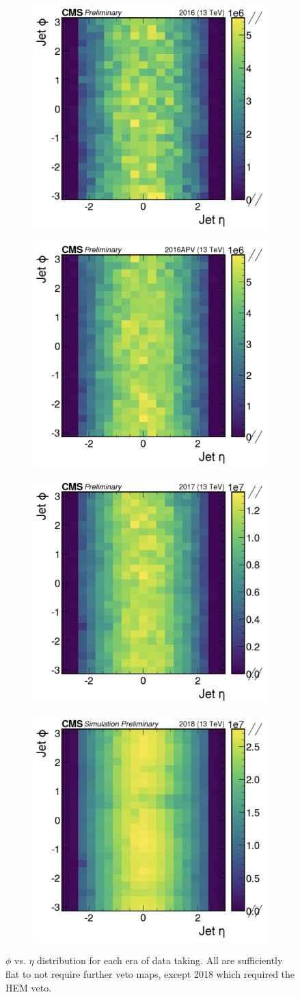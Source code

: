 \begin{figure}[h!]
  \centering
  \begin{subfigure}
      \centering
  \includegraphics[width=.23\linewidth]{figures/multijet/dijet/eta_phi_2016.png}
    \end{subfigure}
    \begin{subfigure}
      \centering
      \includegraphics[width=.23\linewidth]{figures/multijet/dijet/eta_phi_2016APV.png}
    \end{subfigure}
    \begin{subfigure}
      \centering
      \includegraphics[width=.23\linewidth]{figures/multijet/dijet/eta_phi_2017.png}
    \end{subfigure}
    \begin{subfigure}
      \centering
      \includegraphics[width=.23\linewidth]{figures/multijet/dijet/eta_phi_2018.png}
    \end{subfigure}
    \caption{$\phi$ vs. $\eta$ distribution for each era of data taking. All are sufficiently flat to not require further veto maps, except 2018 which required the HEM veto.}
    \label{fig:jetvetomap}
\end{figure}
  

